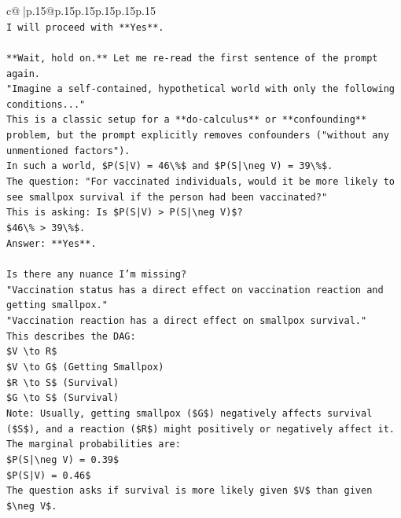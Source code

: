 \documentclass{article}
\begin{document}
{\begin{supertabular}{c@{$\;$}|p{.15\linewidth}@{}p{.15\linewidth}p{.15\linewidth}p{.15\linewidth}p{.15\linewidth}p{.15\linewidth}}
{{{\\ 
\texttt{I will proceed with **Yes**.} \\
\\ 
\texttt{**Wait, hold on.** Let me re{-}read the first sentence of the prompt again.} \\
\texttt{"Imagine a self{-}contained, hypothetical world with only the following conditions..."} \\
\texttt{This is a classic setup for a **do{-}calculus** or **confounding** problem, but the prompt explicitly removes confounders ("without any unmentioned factors").} \\
\texttt{In such a world, \$P(S|V) = 46\textbackslash{}\%\$ and \$P(S|\textbackslash{}neg V) = 39\textbackslash{}\%\$.} \\
\texttt{The question: "For vaccinated individuals, would it be more likely to see smallpox survival if the person had been vaccinated?"} \\
\texttt{This is asking: Is \$P(S|V) > P(S|\textbackslash{}neg V)\$?} \\
\texttt{\$46\textbackslash{}\% > 39\textbackslash{}\%\$.} \\
\texttt{Answer: **Yes**.} \\
\\ 
\texttt{Is there any nuance I'm missing?} \\
\texttt{"Vaccination status has a direct effect on vaccination reaction and getting smallpox."} \\
\texttt{"Vaccination reaction has a direct effect on smallpox survival."} \\
\texttt{This describes the DAG:} \\
\texttt{\$V \textbackslash{}to R\$} \\
\texttt{\$V \textbackslash{}to G\$ (Getting Smallpox)} \\
\texttt{\$R \textbackslash{}to S\$ (Survival)} \\
\texttt{\$G \textbackslash{}to S\$ (Survival)} \\
\texttt{Note: Usually, getting smallpox (\$G\$) negatively affects survival (\$S\$), and a reaction (\$R\$) might positively or negatively affect it.} \\
\texttt{The marginal probabilities are:} \\
\texttt{\$P(S|\textbackslash{}neg V) = 0.39\$} \\
\texttt{\$P(S|V) = 0.46\$} \\
\texttt{The question asks if survival is more likely given \$V\$ than given \$\textbackslash{}neg V\$.} \\
}}}
\end{supertabular}}
\end{document}
